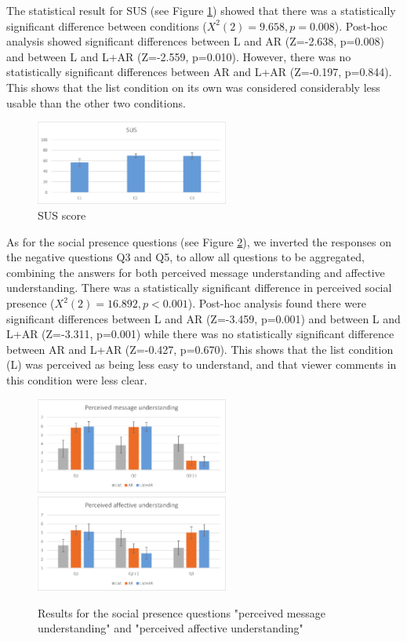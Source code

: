 The statistical result for SUS (see Figure \ref{fig:mgia16:questions_sus}) showed that there was a statistically significant difference between conditions ($X^2(2)=9.658, p=0.008$). Post-hoc analysis showed significant differences between L and AR (Z=-2.638, p=0.008) and between L and L+AR (Z=-2.559, p=0.010). However, there was no statistically significant differences between AR and L+AR (Z=-0.197, p=0.844). This shows that the list condition on its own was considered considerably less usable than the other two conditions.


\begin{figure}[ht]
  \centering
  \includegraphics[width=2.5in]{images/mgia16/sus.eps}
  \caption{SUS score}
  \label{fig:mgia16:questions_sus}
\end{figure}

As for the social presence questions (see Figure \ref{fig:mgia16:social_presence}), we inverted the responses on the negative questions Q3 and Q5, to allow all questions to be aggregated, combining the answers for both perceived message understanding and affective understanding. There was a statistically significant difference in perceived social presence ($X^2(2)=16.892, p<0.001$). Post-hoc analysis found there were significant differences between L and AR (Z=-3.459, p=0.001) and between L and L+AR (Z=-3.311, p=0.001) while there was no statistically significant difference between AR and L+AR (Z=-0.427, p=0.670). This shows that the list condition (L) was perceived as being less easy to understand, and that viewer comments in this condition were less clear.

\begin{figure}[ht]
  \centering
  \includegraphics[width=2.5in]{images/mgia16/message.eps}
  \includegraphics[width=2.5in]{images/mgia16/affective.eps}
  \caption{Results for the social presence questions "perceived message understanding" and "perceived affective understanding"}
	\label{fig:mgia16:social_presence}
\end{figure}

